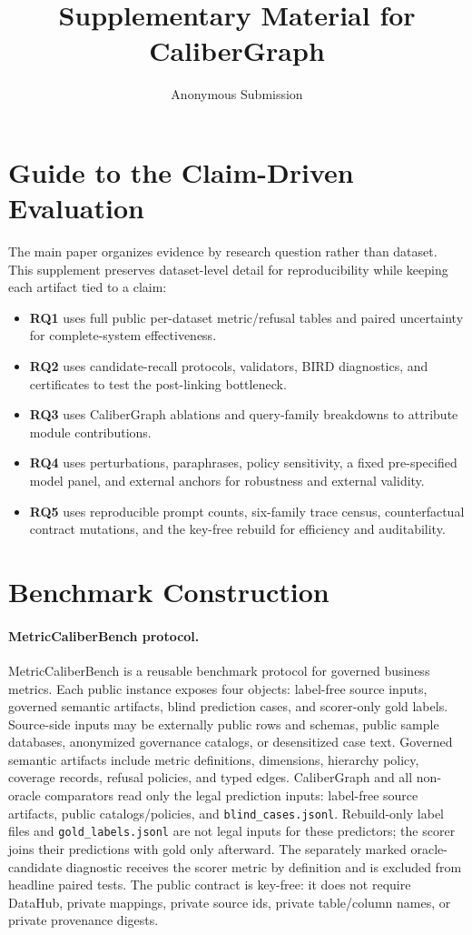 \documentclass[letterpaper]{article}
\title{Supplementary Material for CaliberGraph}
\author{Anonymous Submission}
\begin{document}
\maketitle
\tableofcontents
\bigskip

\section{Guide to the Claim-Driven Evaluation}

The main paper organizes evidence by research question rather than dataset. This supplement preserves dataset-level detail for reproducibility while keeping each artifact tied to a claim:
\begin{itemize}
    \item \textbf{RQ1} uses full public per-dataset metric/refusal tables and paired uncertainty for complete-system effectiveness.
    \item \textbf{RQ2} uses candidate-recall protocols, validators, BIRD diagnostics, and certificates to test the post-linking bottleneck.
    \item \textbf{RQ3} uses CaliberGraph ablations and query-family breakdowns to attribute module contributions.
    \item \textbf{RQ4} uses perturbations, paraphrases, policy sensitivity, a fixed pre-specified model panel, and external anchors for robustness and external validity.
    \item \textbf{RQ5} uses reproducible prompt counts, six-family trace census, counterfactual contract mutations, and the key-free rebuild for efficiency and auditability.
\end{itemize}

\section{Benchmark Construction}

\paragraph{MetricCaliberBench protocol.}
MetricCaliberBench is a reusable benchmark protocol for governed business metrics. Each public instance exposes four objects: label-free source inputs, governed semantic artifacts, blind prediction cases, and scorer-only gold labels. Source-side inputs may be externally public rows and schemas, public sample databases, anonymized governance catalogs, or desensitized case text. Governed semantic artifacts include metric definitions, dimensions, hierarchy policy, coverage records, refusal policies, and typed edges. CaliberGraph and all non-oracle comparators read only the legal prediction inputs: label-free source artifacts, public catalogs/policies, and \texttt{blind\_cases.jsonl}. Rebuild-only label files and \texttt{gold\_labels.jsonl} are not legal inputs for these predictors; the scorer joins their predictions with gold only afterward. The separately marked oracle-candidate diagnostic receives the scorer metric by definition and is excluded from headline paired tests. The public contract is key-free: it does not require DataHub, private mappings, private source ids, private table/column names, or private provenance digests.
\end{document}
